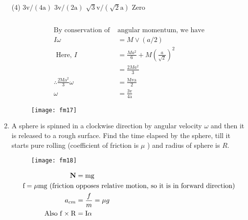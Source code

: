 \begin{enumerate}[label=\color{ocre}\textbf{\arabic*.}]
\begin{figure}[H]
\end{figure}
\begin{tasks}(4)
	\task[\textbf{A.}] $3 \mathrm{v} /(4 \mathrm{a})$
	\task[\textbf{B.}] $3 \mathrm{v} /(2 \mathrm{a})$
	\task[\textbf{C.}] $\sqrt{3} \mathrm{v} /(\sqrt{2} \mathrm{a})$
	\task[\textbf{D.}] Zero
\end{tasks}
\begin{answer}$\left. \right. $\\
	\begin{minipage}{0.65\textwidth}
		\begin{align*}
		\text{By conservation of }&\text{angular momentum, we have}\\
		I \omega&=M \vee(a / 2)\\
		\text{	Here, }I&=\frac{M a^{2}}{6}+M\left(\frac{a}{\sqrt{2}}\right)^{2}\\&=\frac{2 M a^{2}}{3} \\
		\therefore \frac{2 \mathrm{Ma}^{2}}{3} \omega&=\frac{\mathrm{Mva}}{2} \\ \omega&=\frac{3 \mathrm{v}}{4 \mathrm{a}}
		\end{align*}
	\end{minipage}
	\begin{minipage}{0.35\textwidth}
		\begin{figure}[H]
			\centering
			\texttt{[image: fm17]}
		\end{figure}
	\end{minipage}
\end{answer}
	\item A sphere is spinned in a clockwise direction by angular velocity $\omega$ and then it is released to a rough surface. Find the time elapsed by the sphere, till it starts pure rolling (coefficient of friction is $\mu$ ) and radius of sphere is $R$.\\
\begin{figure}[H]
	\centering
	\texttt{[image: fm18]}
\end{figure}
\begin{answer}
	\begin{align}
	\mathbf{N}&=\mathrm{mg}\notag\\
	\text{$\mathrm{f}=\mu \mathrm{mg}$ (friction }&\text{opposes relative motion, so it is in forward direction)}\notag\\
	a_{c m}&=\frac{f}{m}=\mu g\label{fm01}\\
	\text{Also }\mathrm{f} \times \mathrm{R}&=\mathrm{I} \alpha\notag\\

\end{align}
\end{answer}
\end{enumerate}
